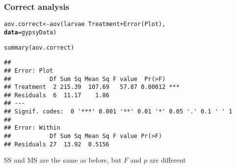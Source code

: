 \documentclass[color=usenames,dvipsnames]{beamer}\usepackage[]{graphicx}\usepackage[]{color}
\makeatletter
\newcommand{\hlopt}[1]{\textcolor[rgb]{0,0,0}{#1}}%
\newcommand{\hlstd}[1]{\textcolor[rgb]{0,0,0}{#1}}%
\newcommand{\hlkwb}[1]{\textcolor[rgb]{0,0.341,0.682}{#1}}%
\newcommand{\hlkwc}[1]{\textcolor[rgb]{0,0,0}{\textbf{#1}}}%
\newcommand{\hlkwd}[1]{\textcolor[rgb]{0.004,0.004,0.506}{#1}}%
\newenvironment{kframe}{%
 \def\at@end@of@kframe{}%
 \ifinner\ifhmode%
  \def\at@end@of@kframe{\end{minipage}}%
  \begin{minipage}{\columnwidth}%
 \fi\fi%
 \def\FrameCommand##1{\hskip\@totalleftmargin \hskip-\fboxsep
 \colorbox{shadecolor}{##1}\hskip-\fboxsep
     \hskip-\linewidth \hskip-\@totalleftmargin \hskip\columnwidth}%
 \MakeFramed {\advance\hsize-\width
   \@totalleftmargin\z@ \linewidth\hsize
   \@setminipage}}%
 {\par\unskip\endMakeFramed%
 \at@end@of@kframe}
\newenvironment{knitrout}{}{} %
\makeatother
\begin{document}
\begin{frame}[fragile]
  \frametitle{Correct analysis}
\begin{knitrout}\small
{}\color{fgcolor}\begin{kframe}
\begin{alltt}
\hlstd{aov.correct} \hlkwb{<-} \hlkwd{aov}\hlstd{(larvae} \hlopt{~} \hlstd{Treatment} \hlopt{+} \hlkwd{Error}\hlstd{(Plot),}
                   \hlkwc{data}\hlstd{=gypsyData)}
\end{alltt}
\end{kframe}
\end{knitrout}
\pause
\begin{knitrout}\small
{}\color{fgcolor}\begin{kframe}
\begin{alltt}
\hlkwd{summary}\hlstd{(aov.correct)}
\end{alltt}
\begin{verbatim}
## 
## Error: Plot
##           Df Sum Sq Mean Sq F value  Pr(>F)    
## Treatment  2 215.39  107.69   57.87 0.00012 ***
## Residuals  6  11.17    1.86                    
## ---
## Signif. codes:  0 '***' 0.001 '**' 0.01 '*' 0.05 '.' 0.1 ' ' 1
## 
## Error: Within
##           Df Sum Sq Mean Sq F value Pr(>F)
## Residuals 27  13.92  0.5156
\end{verbatim}
\end{kframe}
\end{knitrout}
\pause
\vfill
\centering
SS and MS are the same as before, but $F$ and $p$ are different \\
\end{frame}
\end{document}
